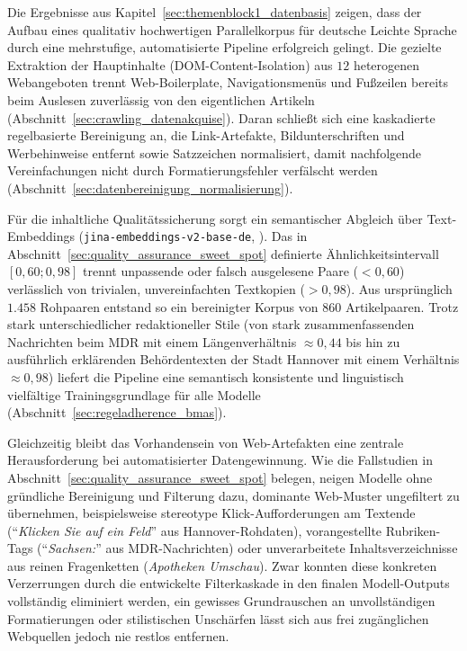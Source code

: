 Die Ergebnisse aus Kapitel~\ref{sec:themenblock1_datenbasis} zeigen, dass der Aufbau eines qualitativ hochwertigen Parallelkorpus für deutsche Leichte Sprache durch eine mehrstufige, automatisierte Pipeline erfolgreich gelingt. Die gezielte Extraktion der Hauptinhalte (DOM-Content-Isolation) aus $12$ heterogenen Webangeboten trennt Web-Boilerplate, Navigationsmenüs und Fußzeilen bereits beim Auslesen zuverlässig von den eigentlichen Artikeln (Abschnitt~\ref{sec:crawling_datenakquise}). Daran schließt sich eine kaskadierte regelbasierte Bereinigung an, die Link-Artefakte, Bildunterschriften und Werbehinweise entfernt sowie Satzzeichen normalisiert, damit nachfolgende Vereinfachungen nicht durch Formatierungsfehler verfälscht werden (Abschnitt~\ref{sec:datenbereinigung_normalisierung}). 

Für die inhaltliche Qualitätssicherung sorgt ein semantischer Abgleich über Text-Embeddings (\texttt{jina-embeddings-v2-base-de}, \citet{gunther2023jina}). Das in Abschnitt~\ref{sec:quality_assurance_sweet_spot} definierte Ähnlichkeitsintervall $[0{,}60; 0{,}98]$ trennt unpassende oder falsch ausgelesene Paare ($< 0{,}60$) verlässlich von trivialen, unvereinfachten Textkopien ($> 0{,}98$). Aus ursprünglich $1.458$ Rohpaaren entstand so ein bereinigter Korpus von $860$ Artikelpaaren. Trotz stark unterschiedlicher redaktioneller Stile (von stark zusammenfassenden Nachrichten beim MDR mit einem Längenverhältnis $\approx 0{,}44$ bis hin zu ausführlich erklärenden Behördentexten der Stadt Hannover mit einem Verhältnis $\approx 0{,}98$) liefert die Pipeline eine semantisch konsistente und linguistisch vielfältige Trainingsgrundlage für alle Modelle (Abschnitt~\ref{sec:regeladherence_bmas}).

Gleichzeitig bleibt das Vorhandensein von Web-Artefakten eine zentrale Herausforderung bei automatisierter Datengewinnung. Wie die Fallstudien in Abschnitt~\ref{sec:quality_assurance_sweet_spot} belegen, neigen Modelle ohne gründliche Bereinigung und Filterung dazu, dominante Web-Muster ungefiltert zu übernehmen, beispielsweise stereotype Klick-Aufforderungen am Textende (\enquote{\textit{Klicken Sie auf ein Feld}} aus Hannover-Rohdaten), vorangestellte Rubriken-Tags (\enquote{\textit{Sachsen:}} aus MDR-Nachrichten) oder unverarbeitete Inhaltsverzeichnisse aus reinen Fragenketten (\textit{Apotheken Umschau}). Zwar konnten diese konkreten Verzerrungen durch die entwickelte Filterkaskade in den finalen Modell-Outputs vollständig eliminiert werden, ein gewisses Grundrauschen an unvollständigen Formatierungen oder stilistischen Unschärfen lässt sich aus frei zugänglichen Webquellen jedoch nie restlos entfernen.

